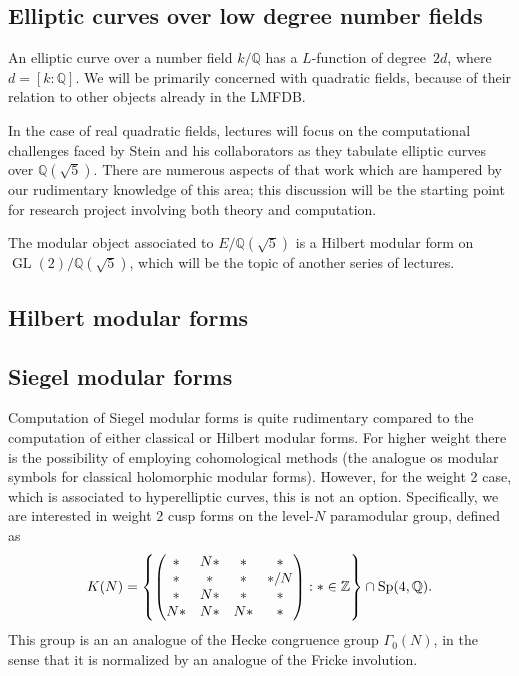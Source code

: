 \documentclass[amstex,11pt]{amsart}
\DeclareMathOperator{\GL}{GL}
\numberwithin{equation}{section}
\newcommand{\Q}{\mathbb Q}
\begin{document}
\subsection{Elliptic curves over low degree number fields}

An elliptic curve over a number field $k/\Q$ has a $L$-function of
degree~$2d$, where $d=[k:\Q]$.  We will be primarily concerned with
quadratic fields, because of their relation to other objects already
in the LMFDB.

In the case of real quadratic fields, lectures will focus on the
computational challenges faced by Stein and his collaborators as they
tabulate elliptic curves over $\Q(\sqrt5)$.  There are numerous
aspects of that work which are hampered by our rudimentary knowledge
of this area; this discussion will be the starting point for research
project involving both theory and computation.

The modular object associated to $E/\Q(\sqrt5)$ is a Hilbert modular
form on $\GL(2)/\Q(\sqrt5)$, which will be the topic of another
series of lectures.


\subsection{Hilbert modular forms}

\subsection{Siegel modular forms}

Computation of Siegel modular forms is quite rudimentary compared to
the computation of either classical or Hilbert modular forms.  For
higher weight there is the possibility of employing cohomological
methods (the analogue os modular symbols for classical holomorphic
modular forms).  However, for the weight 2 case, which is associated
to hyperelliptic curves, this is not an option.  Specifically, we are
interested in weight 2 cusp forms on the level-$N$ paramodular group,
defined as
$$
K(N)=\left\{
\left(\begin{matrix}
  * & N* & * &*\\
* & * & * & */N\\
* & N* &*&*\\
N*&N*&N*&*
\end{matrix}\right)
:
*\in{\Bbb Z}\right\}\cap \mathrm{Sp}(4, {\Bbb Q}).
$$
This group is an an analogue of the Hecke congruence group
$\Gamma_0(N)$, in the sense that it is normalized by an analogue of
the Fricke involution.
\end{document}
